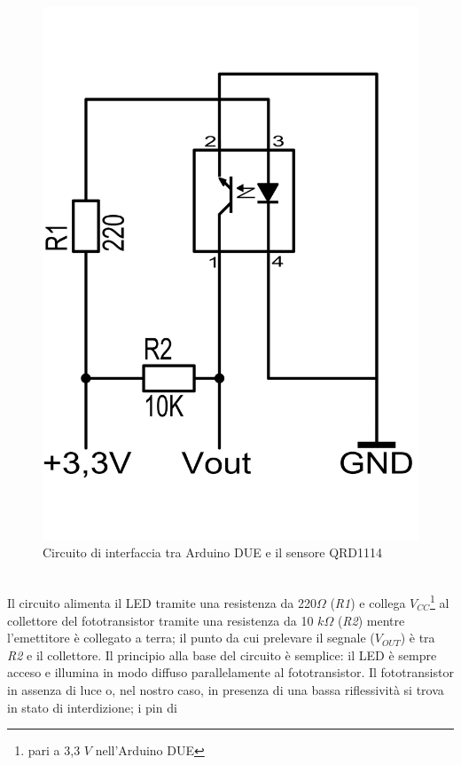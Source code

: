 \begin{figure}[!htb] \center
\includegraphics[scale=0.3]{immagini/QRD1114_Circuito.png}
\caption{Circuito di interfaccia tra Arduino DUE e il sensore QRD1114} 
\end{figure}
\\Il circuito alimenta il LED tramite una resistenza da 220$\Omega$ (\textit{R1}) 
e collega $V_{CC}$\footnote{pari a 3,3 $V$ nell'Arduino DUE} al collettore del 
fototransistor tramite una resistenza da 10 $k\Omega$ (\textit{R2}) mentre 
l'emettitore è collegato a terra; il punto da cui prelevare il segnale ($V_{OUT
}$) è tra \textit{R2} e il collettore. Il principio alla base del circuito è 
semplice: il LED è sempre acceso e illumina in modo diffuso parallelamente al 
fototransistor. Il fototransistor in assenza di luce o, nel nostro caso, in 
presenza di una bassa riflessività si trova in stato di interdizione; i pin di 
